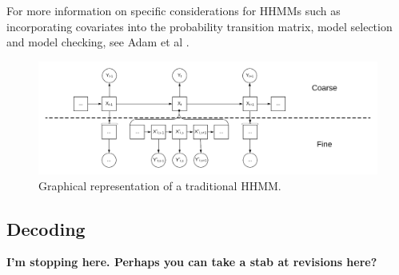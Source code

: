 For more information on specific considerations for HHMMs such as incorporating covariates into the probability transition matrix, model selection and model checking, see Adam et al \citep{Adam:2019}.

\begin{figure}[ht]
	\centering
	\includegraphics[width=5in]{../Plots/HHMM.png}
	\caption{Graphical representation of a traditional HHMM.}
	\label{fig:HHMM}
\end{figure}

\subsection{Decoding}

{\bf{I'm stopping here.  Perhaps you can take a stab at revisions here?}}

